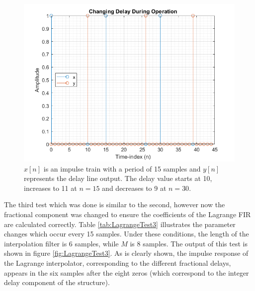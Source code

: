 \documentclass[../main.tex]{subfiles}
\begin{document}
\begin{figure}[h]
    \centering
    \includegraphics[scale=.65]{./images/plots/LagrangeTest2.png}
    \caption{$x[n]$ is an impulse train with a period of 15 samples and $y[n]$ represents the delay line output. The delay value starts at 10, increases to 11 at $n = 15$ and decreases to 9 at $n = 30$.}
    \label{fig:LagrangeTest2}
\end{figure}

The third test which was done is similar to the second, however now the fractional component was changed to ensure the coefficients of the Lagrange FIR are calculated correctly. Table \ref{tab:LagrangeTest3} illustrates the parameter changes which occur every 15 samples. Under these conditions, the length of the interpolation filter is 6 samples, while $M$ is 8 samples. The output of this test is shown in figure \ref{fig:LagrangeTest3}. As is clearly shown, the impulse response of the Lagrange interpolator, corresponding to the different fractional delays, appears in the six samples after the eight zeros (which correspond to the integer delay component of the structure).
\end{document}
